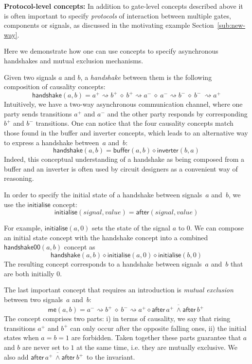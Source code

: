 \documentclass[british, journal]{IEEEtran}
\begin{document}
\textbf{Protocol-level concepts:} In addition to gate-level concepts
described above it is often important to specify \emph{protocols}
of interaction between multiple gates, components or signals, as
discussed in the motivating example Section~\ref{sub:new-way}.

Here we demonstrate how one can use concepts to specify asynchronous handshakes
and mutual exclusion mechanisms.

Given two signals $a$ and $b$, a \emph{handshake} between them is
the following composition of causality concepts:
\[
\mathsf{handshake}(a, b)=a^{+}\!\rightsquigarrow\! b^{+}\ \diamond\ b^{+}\!\rightsquigarrow\! a^{-}\ \diamond\ a^{-}\!\rightsquigarrow\! b^{-}\ \diamond\ b^{-}\ \rightsquigarrow\! a^{+}
\]
Intuitively, we have a two-way asynchronous communication channel,
where one party sends transitions $a^{+}$ and $a^{-}$ and the other
party responds by corresponding $b^{+}$ and $b^{-}$ transitions.
One can notice that the four causality concepts match those found
in the buffer and inverter concepts, which leads to an alternative
way to express a handshake between~$a$ and~$b$:
\[
\mathsf{handshake}(a, b)=\mathsf{buffer}(a, b) \diamond\mathsf{inverter}(b, a)
\]
Indeed, this conceptual understanding of a handshake as being composed
from a buffer and an inverter is often used by circuit designers as
a convenient way of reasoning.

In order to specify the initial state of a handshake between signals~$a$
and~$b$, we use the $\mathsf{initialise}$ concept:
\[
\mathsf{initialise}(\mathit{signal},\mathit{value})=\mathsf{after}(signal, value)
\]

\noindent For example, $\mathsf{initialise}(a, 0)$ sets the state of the signal
$a$ to $0$. We can compose an initial state concept with the handshake concept
into a combined $\mathsf{handshake00}(a, b)$ concept as
\[
\mathsf{handshake}(a, b) \diamond \mathsf{initialise}(a, 0) \diamond \mathsf{initialise}(b, 0)
\]
The resulting concept corresponds to a handshake between signals~$a$
and~$b$ that are both initially $0$.

The last important concept that requires an introduction is \emph{mutual
exclusion} between two signals~$a$ and~$b$:
\[
\mathsf{me}(a, b) = a^{-}\rightsquigarrow b^{+}\ \diamond\ b^{-}\rightsquigarrow a^{+}\diamond\overline{\mathsf{after}\,a^{+} \, \wedge\mathsf{after}\,b^{+}\, }
\]
The concept comprises two parts: i) in terms of causality, we say
that rising transitions $a^{+}$ and $b^{+}$ can only occur after
the opposite falling ones, ii) the initial states when $a=b=1$ are
forbidden. Taken together these parts guarantee that $a$ and
$b$ are never set to $1$ at the same time, i.e. they are mutually
exclusive. We also add $\overline{\mathsf{after}\, a^{+} \, \wedge\mathsf{after}\ b^{+}\,}$
to the invariant.
\end{document}
